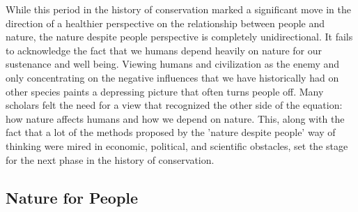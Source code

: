 \documentclass[rutwik_proposal.tex]{subfiles}
\begin{document}
While this period in the history of conservation marked a significant move in the direction of a healthier perspective on the relationship between people and nature, the nature despite people perspective is completely unidirectional. It fails to acknowledge the fact that we humans depend heavily on nature for our sustenance and well being. Viewing humans and civilization as the enemy and only concentrating on the negative influences that we have historically had on other species paints a depressing picture that often turns people off. Many scholars felt the need for a view that recognized the other side of the equation: how nature affects humans and how we depend on nature. This, along with the fact that a lot of the methods proposed by the 'nature despite people' way of thinking were mired in economic, political, and scientific obstacles, set the stage for the next phase in the history of conservation.

\subsection{Nature for People}\label{ecoservices}
\end{document}
